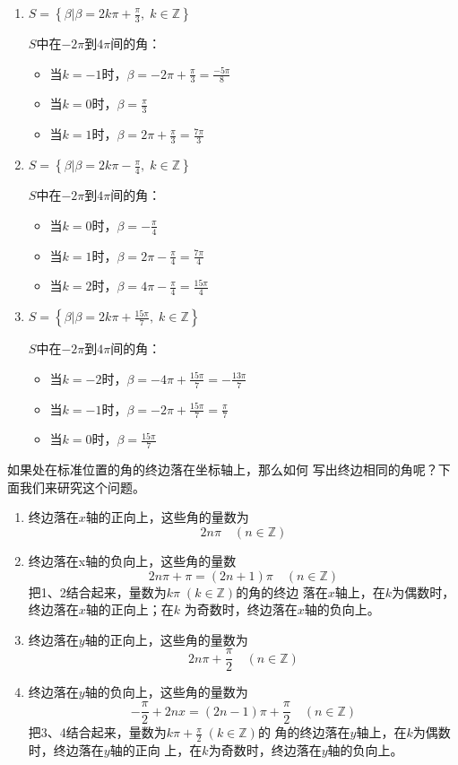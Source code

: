 \begin{solution}
\begin{enumerate}
    \item 
$S=\left\{\beta \Big|\beta =2k\pi+\frac{\pi}{3},\; k\in\mathbb{Z}\right\}$

$S$中在$-2\pi$到$4\pi$间的角：
\begin{itemize}
    \item 当$k=-1$时，$\beta =-2\pi+\frac{\pi}{3}=\frac{-5\pi}{8}$
    \item 当$k=0$时，$\beta=\frac{\pi}{3}$ 
    \item 当$k=1$时，$\beta =2\pi+\frac{\pi}{3}=\frac{7\pi}{3}$
\end{itemize}

\item $S=\left\{\beta \Big|\beta =2k\pi-\frac{\pi}{4},\;k\in\mathbb{Z}\right\}$

$S$中在$-2\pi$到$4\pi$间的角：
\begin{itemize}
    \item 当$k=0$时，$\beta =-\frac{\pi}{4}$
    \item 当$k=1$时，$\beta =2\pi-\frac{\pi}{4}=\frac{7\pi}{4}$
    \item 当$k=2$时，$\beta =4\pi-\frac{\pi}{4}=\frac{15\pi}{4}$
\end{itemize}

\item $S=\left\{\beta \Big|\beta =2k\pi+\frac{15\pi}{7},\; k\in\mathbb{Z}\right\}$

$S$中在$-2\pi$到$4\pi$间的角：
\begin{itemize}
    \item 当$k=-2$时，$\beta =-4\pi+\frac{15\pi}{7}=-\frac{13\pi}{7}$
    \item 当$k=-1$时，$\beta =-2\pi+\frac{15\pi}{7}=\frac{\pi}{7}$
    \item 当$k=0$时，$\beta=\frac{15\pi}{7}$
\end{itemize}
\end{enumerate}    
\end{solution}

如果处在标准位置的角的终边落在坐标轴上，那么如何
写出终边相同的角呢？下面我们来研究这个问题。

\begin{enumerate}
    \item 终边落在$x$轴的正向上，这些角的量数为
\[2n\pi\quad  (n\in\mathbb{Z})\]
\item 终边落在x轴的负向上，这些角的量数
\[2n\pi +\pi =(2n+1)\pi\quad  (n\in\mathbb{Z})\]
把1、2结合起来，量数为$k\pi\;  (k\in\mathbb{Z})$的角的终边
落在$x$轴上，在$k$为偶数时，终边落在$x$轴的正向上；在$k$
为奇数时，终边落在$x$轴的负向上。
\item 终边落在$y$轴的正向上，这些角的量数为
\[2n\pi +\frac{\pi}{2}\quad (n\in\mathbb{Z})\]
\item 终边落在$y$轴的负向上，这些角的量数为
\[-\frac{\pi}{2}+2nx=(2n-1)\pi +\frac{\pi}{2}\quad (n\in\mathbb{Z})\]
把3、4结合起来，量数为$k\pi +\frac{\pi}{2}\; (k\in\mathbb{Z})$的
角的终边落在$y$轴上，在$k$为偶数时，终边落在$y$轴的正向
上，在$k$为奇数时，终边落在$y$轴的负向上。
\end{enumerate}

